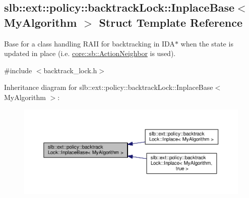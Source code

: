 \hypertarget{structslb_1_1ext_1_1policy_1_1backtrackLock_1_1InplaceBase}{}\subsection{slb\+:\+:ext\+:\+:policy\+:\+:backtrack\+Lock\+:\+:Inplace\+Base$<$ My\+Algorithm $>$ Struct Template Reference}
\label{structslb_1_1ext_1_1policy_1_1backtrackLock_1_1InplaceBase}


Base for a class handling R\+A\+II for backtracking in I\+D\+A$\ast$ when the state is updated in place (i.\+e. \hyperlink{structslb_1_1core_1_1sb_1_1ActionNeighbor}{core\+::sb\+::\+Action\+Neighbor} is used).  




{\ttfamily \#include $<$backtrack\+\_\+lock.\+h$>$}



Inheritance diagram for slb\+:\+:ext\+:\+:policy\+:\+:backtrack\+Lock\+:\+:Inplace\+Base$<$ My\+Algorithm $>$\+:\nopagebreak
\begin{figure}[H]
\begin{center}
\leavevmode
\includegraphics[width=350pt]{structslb_1_1ext_1_1policy_1_1backtrackLock_1_1InplaceBase__inherit__graph}
\end{center}
\end{figure}
